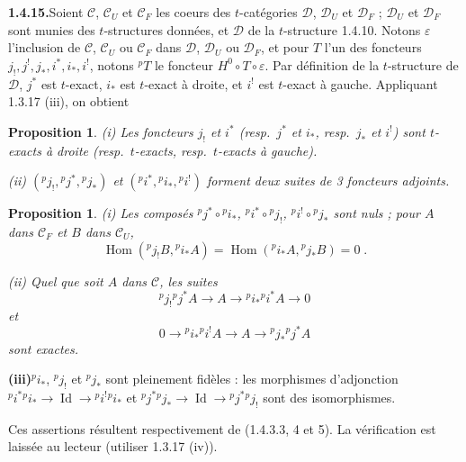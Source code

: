 \documentclass[12pt,a4paper]{article}
\theoremstyle{plain}
\newtheorem{proposition}[theorem]{Proposition}
\theoremstyle{definition}
\DeclareMathOperator{\Hom}{Hom}
\DeclareMathOperator{\Id}{Id}
\begin{document}
\smallskip
\noindent\textbf{1.4.15.}\quad Soient $\mathcal{C}$, $\mathcal{C}_U$ et $\mathcal{C}_F$ les coeurs des $t$-cat\'egories $\mathcal{D}$, $\mathcal{D}_U$ et $\mathcal{D}_F$ ; $\mathcal{D}_U$ et $\mathcal{D}_F$ sont munies des $t$-structures donn\'ees, et $\mathcal{D}$ de la $t$-structure 1.4.10. Notons $\varepsilon$ l'inclusion de $\mathcal{C}$, $\mathcal{C}_U$ ou $\mathcal{C}_F$ dans $\mathcal{D}$, $\mathcal{D}_U$ ou $\mathcal{D}_F$, et pour $T$ l'un des foncteurs $j_!, j^!, j_*, i^*, i_*, i^!$, notons ${}^p T$ le foncteur $H^0 \circ T \circ \varepsilon$. Par d\'efinition de la $t$-structure de $\mathcal{D}$, $j^*$ est $t$-exact, $i_*$ est $t$-exact \`a droite, et $i^!$ est $t$-exact \`a gauche. Appliquant 1.3.17 (iii), on obtient

\begin{proposition}\label{prop:1.4.16}
\emph{(i)} Les foncteurs $j_!$ et $i^*$ (resp.\ $j^*$ et $i_*$, resp.\ $j_*$ et $i^!$) sont $t$-exacts \`a droite (resp.\ $t$-exacts, resp.\ $t$-exacts \`a gauche).

\emph{(ii)} $({}^p j_!, {}^p j^*, {}^p j_*)$ et $({}^p i^*, {}^p i_*, {}^p i^!)$ forment deux suites de 3 foncteurs adjoints.
\end{proposition}

\begin{proposition}\label{prop:1.4.17}
\emph{(i)} Les compos\'es ${}^p j^* \circ {}^p i_*$, ${}^p i^* \circ {}^p j_!$, ${}^p i^! \circ {}^p j_*$ sont nuls ; pour $A$ dans $\mathcal{C}_F$ et $B$ dans $\mathcal{C}_U$,
\[
\Hom({}^p j_! B, {}^p i_* A) = \Hom({}^p i_* A, {}^p j_* B) = 0\;.
\]

\emph{(ii)} Quel que soit $A$ dans $\mathcal{C}$, les suites
\[
{}^p j_! {}^p j^* A \to A \to {}^p i_* {}^p i^* A \to 0
\]
et
\[
0 \to {}^p i_* {}^p i^! A \to A \to {}^p j_* {}^p j^* A
\]
sont exactes.
\end{proposition}

\smallskip
\noindent\textbf{(iii)}\quad ${}^p i_*$, ${}^p j_!$ et ${}^p j_*$ sont pleinement fid\`eles : les morphismes d'adjonction ${}^p i^* {}^p i_* \to \Id \to {}^p i^! {}^p i_*$ et ${}^p j^* {}^p j_* \to \Id \to {}^p j^* {}^p j_!$ sont des isomorphismes.

Ces assertions r\'esultent respectivement de (1.4.3.3, 4 et 5). La v\'erification est laiss\'ee au lecteur (utiliser 1.3.17 (iv)).
\end{document}

